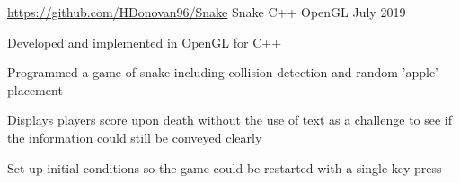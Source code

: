 

\begin{cventries}
    \cventry
    {\href{https://github.com/HDonovan96/Snake}{https://github.com/HDonovan96/Snake}}
    {Snake}
    {C++ OpenGL}
    {July 2019}
    {
        \begin{cvitems}
            \item Developed and implemented in OpenGL for C++
            \item Programmed a game of snake including collision detection and random 'apple' placement
            \item Displays players score upon death without the use of text as a challenge to see if the information could still be conveyed clearly
            \item Set up initial conditions so the game could be restarted with a single key press
        \end{cvitems}  
    }

    
\end{cventries}